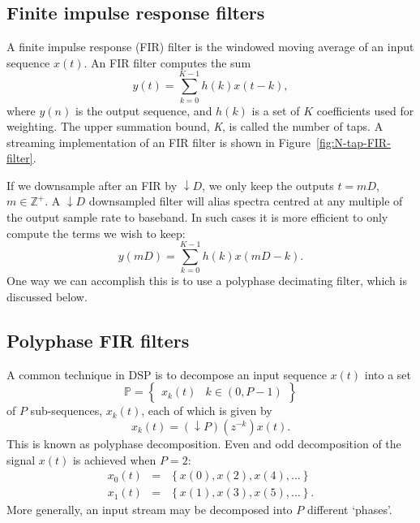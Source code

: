 \documentclass{ws-rv961x669}
\begin{document}
\subsection{Finite impulse response filters}

A finite impulse response (FIR) filter is the windowed moving average
of an input sequence $x(t)$. An FIR filter computes the sum 
\begin{equation}
y(t)=\sum_{k=0}^{K-1}h(k)x(t-k),\label{eq:FIR-filter}
\end{equation}
where $y(n)$ is the output sequence, and $h(k)$ is a set of $K$
coefficients used for weighting. The upper summation bound, \emph{K},
is called the number of taps.\emph{ }A streaming implementation of
an FIR filter is shown in Figure~\ref{fig:N-tap-FIR-filter}.

If we downsample after an FIR by $\downarrow D$, we only keep the
outputs $t=mD$, $m\in\mathbb{Z}^{+}$. A $\downarrow D$ downsampled
filter will alias spectra centred at any multiple of the output sample
rate to baseband. In such cases it is more efficient to only compute
the terms we wish to keep: 
\begin{equation}
y(mD)=\sum_{k=0}^{K-1}h(k)x(mD-k).\label{eq:FIR-filter-decimated}
\end{equation}
One way we can accomplish this is to use a polyphase decimating filter,
which is discussed below. 


\subsection{Polyphase FIR filters}

A common technique in DSP is to decompose an input sequence $x(t)$
into a set
\begin{equation}
\mathbb{P}=\begin{Bmatrix}x_{k}(t) & k\in(0,P-1)\end{Bmatrix}
\end{equation}
of $P$ sub-sequences, $x_{k}(t)$, each of which is given by 
\begin{equation}
x_{k}(t)=(\downarrow P)(z^{-k})x(t).
\end{equation}
This is known as polyphase decomposition. Even and odd decomposition
of the signal $x(t)$ is achieved when $P=\mbox{2}$:
\begin{eqnarray}
x_{0}(t) & = & \left\{ x(0),x(2),x(4),...\right\} \\
x_{1}(t) & = & \left\{ x(1),x(3),x(5),...\right\} .
\end{eqnarray}
More generally, an input stream may be decomposed into $P$ different
`phases'.
\end{document}
